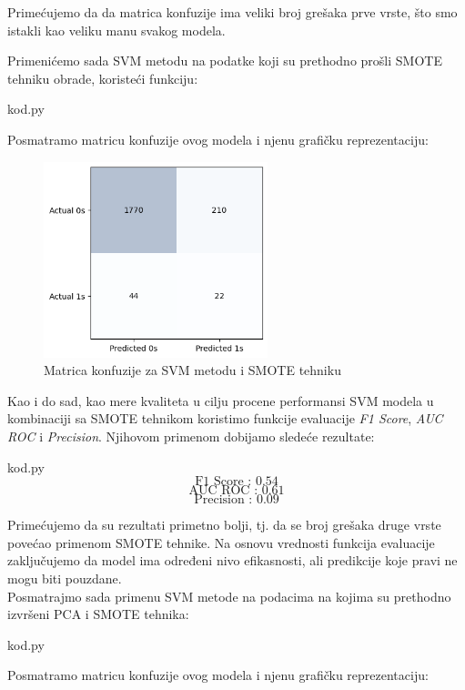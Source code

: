 \documentclass[12pt]{article}
\theoremstyle{definition}
\theoremstyle{remark}
\begin{document}
Primećujemo da da matrica konfuzije ima veliki broj grešaka prve vrste, što smo istakli kao veliku manu svakog modela.

Primenićemo sada SVM metodu na podatke koji su prethodno prošli SMOTE tehniku obrade, koristeći funkciju:


\hfill

{kod.py}

\hfill

Posmatramo matricu konfuzije ovog modela i njenu grafičku reprezentaciju:

\begin{figure}[htp]
    \centering
    \includegraphics[width=6.5cm]{output_77_0.png}
    \caption{Matrica konfuzije za SVM metodu i SMOTE tehniku}
    \label{fig:galaxy}
\end{figure}
\newpage


Kao i do sad, kao mere kvaliteta u cilju procene performansi SVM modela u kombinaciji sa SMOTE tehnikom koristimo funkcije evaluacije  \emph{F1 Score}, \emph{AUC ROC} i \emph{Precision}. Njihovom primenom dobijamo sledeće rezultate:

\hfill

{kod.py}
$$
\text{F1 Score : 0.54}
$$
$$
\text{AUC ROC : 0.61}
$$
$$
\text{Precision : 0.09}
$$

Primećujemo da su rezultati primetno bolji, tj. da se broj grešaka druge vrste povećao primenom SMOTE tehnike. Na osnovu vrednosti funkcija evaluacije zaključujemo da model ima određeni nivo efikasnosti, ali predikcije koje pravi ne mogu biti pouzdane.\\

Posmatrajmo sada primenu SVM metode na podacima na kojima su prethodno izvršeni PCA i SMOTE tehnika:

\hfill

{kod.py}

\hfill

Posmatramo matricu konfuzije ovog modela i njenu grafičku reprezentaciju:
\end{document}
